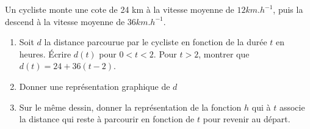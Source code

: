
Un cycliste monte une cote de 24 km à la vitesse moyenne de $12 km.h^{-1}$, puis la descend à la vitesse moyenne de $36 km.h^{-1}$.
\begin{enumerate}
\item Soit $d$ la distance parcourue par le cycliste en fonction de la durée $t$ en heures. Écrire $d(t)$ pour $0<t<2$. Pour $t>2$, montrer que $d(t)=24+36(t-2)$.
\item Donner une représentation graphique de $d$
\item Sur le même dessin, donner la représentation de la fonction $h$ qui à $t$ associe la distance qui reste à parcourir en fonction de $t$ pour revenir au départ.
\end{enumerate}